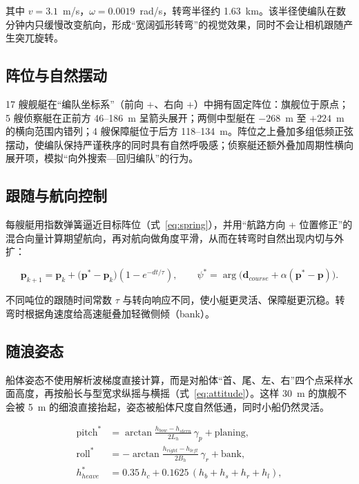 \documentclass[UTF8, a4paper, 11pt]{ctexart}
\begin{document}
其中 $v=3.1$~m/s，$\omega=0.0019$~rad/s，转弯半径约 1.63~km。该半径使编队在数分钟内只缓慢改变航向，形成“宽阔弧形转弯”的视觉效果，同时不会让相机跟随产生突兀旋转。

\subsection{阵位与自然摆动}

17 艘舰艇在“编队坐标系”（前向 $+$、右向 $+$）中拥有固定阵位：旗舰位于原点；5 艘侦察艇在正前方 46--186~m 呈箭头展开；两侧中型艇在 $-268$~m 至 $+224$~m 的横向范围内错列；4 艘保障艇位于后方 118--134~m。阵位之上叠加多组低频正弦摆动，使编队保持严谨秩序的同时具有自然呼吸感；侦察艇还额外叠加周期性横向展开项，模拟“向外搜索—回归编队”的行为。

\subsection{跟随与航向控制}

每艘艇用指数弹簧逼近目标阵位（式~\ref{eq:spring}），并用“航路方向 + 位置修正”的混合向量计算期望航向，再对航向做角度平滑，从而在转弯时自然出现内切与外扩：

\begin{equation}
\mathbf{p}_{k+1}=\mathbf{p}_k+\big(\mathbf{p}^{\ast}-\mathbf{p}_k\big)\left(1-e^{-dt/\tau}\right),
\qquad
\psi^{\ast}=\arg\Big(\mathbf{d}_{course}+\alpha(\mathbf{p}^{\ast}-\mathbf{p})\Big).
\label{eq:spring}
\end{equation}

不同吨位的跟随时间常数 $\tau$ 与转向响应不同，使小艇更灵活、保障艇更沉稳。转弯时根据角速度给高速艇叠加轻微侧倾（bank）。

\subsection{随浪姿态}

船体姿态不使用解析波梯度直接计算，而是对船体“首、尾、左、右”四个点采样水面高度，再按船长与型宽求纵摇与横摇（式~\ref{eq:attitude}）。这样 30~m 的旗舰不会被 5~m 的细浪直接抬起，姿态被船体尺度自然低通，同时小船仍然灵活。

\begin{equation}
\begin{aligned}
\text{pitch}^{\ast} &= \arctan\frac{h_{bow}-h_{stern}}{2L_h}\,\gamma_p + \text{planing},\\
\text{roll}^{\ast} &= -\arctan\frac{h_{right}-h_{left}}{2B_h}\,\gamma_r + \text{bank},\\
h_{heave}^{\ast} &= 0.35\,h_c + 0.1625\,(h_b+h_s+h_r+h_l),
\end{aligned}
\label{eq:attitude}
\end{equation}
\end{document}
